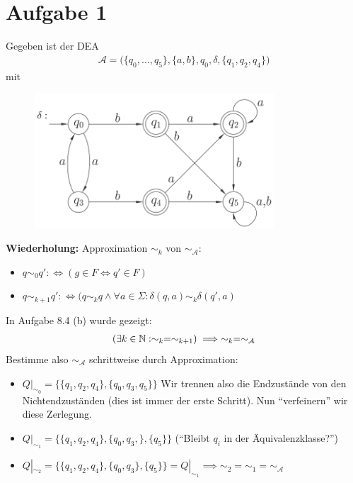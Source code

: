 \documentclass[12pt,a4paper]{article}
\newcommand{\A}{\mathcal{A}}
\begin{document}
\section*{Aufgabe 1}
Gegeben ist der DEA
\begin{align*}
	\A=\Big(\lbrace q_0,\ldots,q_5\rbrace,\lbrace a,b\rbrace,q_0,\delta,\lbrace q_1,q_2,q_4\rbrace\Big)
\end{align*}
mit
\begin{figure}[H] 
	\begin{center}
		\includegraphics[width=0.8\textwidth]{Blatt9.png}
	\end{center}
\end{figure}

\textbf{Wiederholung:} Approximation $\sim_k$ von $\sim_\A$:
\begin{itemize}
\item $q\sim_0 q':\Longleftrightarrow (g\in F\Leftrightarrow q'\in F)$
\item $q\sim_{k+1} q':\Longleftrightarrow(q\sim_k q\wedge\forall a\in\Sigma:\delta(q,a)\sim_k\delta(q',a)$
\end{itemize}
In Aufgabe 8.4 (b) wurde gezeigt:
\begin{align*}
	(\exists k\in\N:\sim_k=\sim_{k+1})\implies\sim_k=\sim_\A
\end{align*}
Bestimme also $\sim_\A$ schrittweise durch Approximation:
\begin{itemize}
	\item $Q|_{\sim_0}=\big\lbrace\lbrace q_1,q_2,q_4\rbrace,\lbrace q_0,q_3,q_5\rbrace\big\rbrace$ Wir trennen also die Endzustände von den Nichtendzuständen (dies ist immer der erste Schritt). Nun ``verfeinern'' wir diese Zerlegung.
	\item $Q|_{\sim_1}=\big\lbrace\lbrace q_1,q_2,q_4\rbrace,\lbrace q_0,q_3,\rbrace,\lbrace q_5\rbrace\big\rbrace$ (``Bleibt $q_i$ in der Äquivalenzklasse?'')
	\item $Q|_{\sim_2}=\big\lbrace\lbrace q_1,q_2,q_4\rbrace,\lbrace q_0,q_3\rbrace,\lbrace q_5\rbrace\big\rbrace=Q|_{\sim_1}\implies \sim_2=\sim_1=\sim_\A$ 
\end{itemize}
\end{document}
